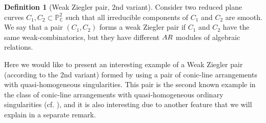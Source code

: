 \documentclass[12pt]{article}
\theoremstyle{plain}
\theoremstyle{definition}
\newtheorem{definition}[thm]{Definition}
\begin{document}
\begin{definition}[Weak Ziegler pair, 2nd variant]
Consider two reduced plane curves $C_{1}, C_{2} \subset \mathbb{P}^{2}_{\mathbb{C}}$ such that all irreducible components of $C_{1}$ and $C_{2}$ are smooth. We say that a pair $(C_{1},C_{2})$ forms a weak Ziegler pair if $C_{1}$ and $C_{2}$ have the same weak-combinatorics, but they have different ${\rm AR}$ modules of algebraic relations.
\end{definition}
Here we would like to present an interesting example of a Weak Ziegler pair (according to the 2nd variant) formed by using a pair of conic-line arrangements with quasi-homogeneous singularities. This pair is the second known example in the class of conic-line arrangements with quasi-homogeneous ordinary singularities (cf. \cite{LBW}), and it is also interesting due to another feature that we will explain in a separate remark.
\end{document}
